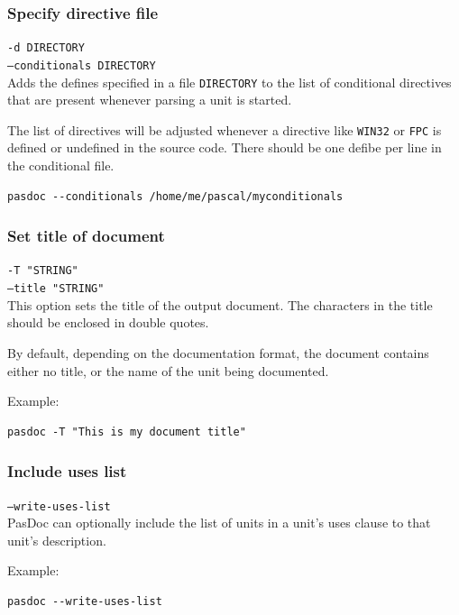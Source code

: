\documentclass[11pt]{article}
\begin{document}
\subsubsection{Specify directive file}
\label{specifydirectives}

{\tt -d DIRECTORY}\\
{\tt --conditionals DIRECTORY}\\

Adds the defines specified in a file {\tt DIRECTORY} to the list of conditional directives
that are present whenever parsing a unit is started.

The list of directives will be adjusted whenever a directive like {\tt WIN32}
or {\tt FPC} is defined or undefined in the source code. There should be one
defibe per line in the conditional file.

\begin{verbatim}
pasdoc --conditionals /home/me/pascal/myconditionals
\end{verbatim}

\subsubsection{Set title of document}

{\tt -T "STRING"}\\
{\tt --title "STRING"}\\

This option sets the title of the output document.
The characters in the title should be enclosed in double quotes.

By default, depending on the documentation format, the document
contains either no title, or the name of the unit being documented.

Example:
\begin{verbatim}
pasdoc -T "This is my document title"
\end{verbatim}

\subsubsection{Include uses list}

{\tt --write-uses-list}\\

PasDoc can optionally include the list of units in a unit's uses
clause to that unit's description.

Example:
\begin{verbatim}
pasdoc --write-uses-list
\end{verbatim}
\end{document}
